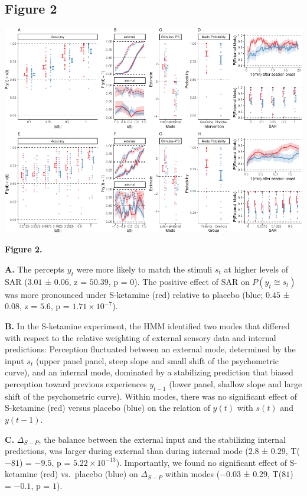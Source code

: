 \documentclass[
]{article}
\begin{document}
\newpage

\hypertarget{figure-2}{%
\subsection{Figure 2}\label{figure-2}}

\includegraphics{modes_ketamine_scz_files/figure-latex/Figure_2-1.pdf}

\textbf{Figure 2.}

\textbf{A.} The percepts \(y_t\) were more likely to match the stimuli
\(s_t\) at higher levels of SAR (\(3.01\) ± \(0.06\), z = \(50.39\), p =
\(0\)). The positive effect of SAR on \(P(y_t \cong s_t)\) was more
pronounced under S-ketamine (red) relative to placebo (blue; \(0.45\) ±
\(0.08\), z = \(5.6\), p = \(\ensuremath{1.71\times 10^{-7}}\)).

\textbf{B.} In the S-ketamine experiment, the HMM identified two modes
that differed with respect to the relative weighting of external sensory
data and internal predictions: Perception fluctuated between an external
mode, determined by the input \(s_t\) (upper panel panel, steep slope
and small shift of the psychometric curve), and an internal mode,
dominated by a stabilizing prediction that biased perception toward
previous experiences \(y_{t-1}\) (lower panel, shallow slope and large
shift of the psychometric curve). Within modes, there was no significant
effect of S-ketamine (red) versus placebo (blue) on the relation of
\(y(t)\) with \(s(t)\) and \(y(t-1)\).

\textbf{C.} \(\Delta_{S-P}\), the balance between the external input and
the stabilizing internal predictions, was larger during external than
during internal mode (\(2.8\) ± \(0.29\), T(\(-81\)) = \(-9.5\), p =
\(\ensuremath{5.22\times 10^{-13}}\)). Importantly, we found no
significant effect of S-ketamine (red) vs.~placebo (blue) on
\(\Delta_{S-P}\) within modes (\(-0.03\) ± \(0.29\), T(\(81\)) =
\(-0.1\), p = \(1\)).
\end{document}
